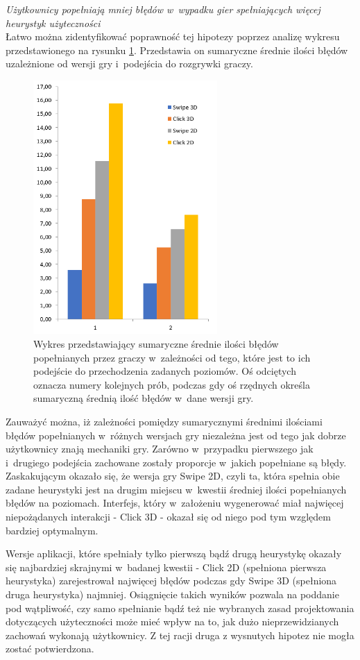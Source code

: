 \documentclass[a4paper,12pt,numbers=noenddot]{report}
\begin{document}
\textit{Użytkownicy popełniają mniej błędów w~wypadku gier spełniających więcej heurystyk użyteczności}\\

Łatwo można zidentyfikować poprawność tej hipotezy poprzez analizę wykresu przedstawionego na rysunku \ref{fig:diag_errors_sum}. Przedstawia on sumaryczne średnie ilości błędów uzależnione od wersji gry i~podejścia do rozgrywki graczy.

\begin{figure}[h!]
	\centering
  	\includegraphics[width=7cm]{diag/errors_sum.png}
	\caption{Wykres przedstawiający sumaryczne średnie ilości błędów popełnianych przez graczy w~zależności od tego, które jest to ich podejście do przechodzenia zadanych poziomów. Oś odciętych oznacza numery kolejnych prób, podczas gdy oś rzędnych określa sumaryczną średnią ilość błędów w~dane wersji gry.}
	\label{fig:diag_errors_sum}
\end{figure}

Zauważyć można, iż zależności pomiędzy sumarycznymi średnimi ilościami błędów popełnianych w~różnych wersjach gry niezależna jest od tego jak dobrze użytkownicy znają mechaniki gry. Zarówno w~przypadku pierwszego jak i~drugiego podejścia zachowane zostały proporcje w~jakich popełniane są błędy. Zaskakującym okazało się, że wersja gry Swipe 2D, czyli ta, która spełnia obie zadane heurystyki jest na drugim miejscu w~kwestii średniej ilości popełnianych błędów na poziomach. Interfejs, który w~założeniu wygenerować miał najwięcej niepożądanych interakcji - Click 3D - okazał się od niego pod tym względem bardziej optymalnym. 

Wersje aplikacji, które spełniały tylko pierwszą bądź drugą heurystykę okazały się najbardziej skrajnymi w~badanej kwestii - Click 2D (spełniona pierwsza heurystyka) zarejestrował najwięcej błędów podczas gdy Swipe 3D (spełniona druga heurystyka) najmniej. 
Osiągnięcie takich wyników pozwala na poddanie pod wątpliwość, czy samo spełnianie bądź też nie wybranych zasad projektowania dotyczących użyteczności może mieć wpływ na to, jak dużo nieprzewidzianych zachowań wykonają użytkownicy. Z tej racji druga z wysnutych hipotez nie mogła zostać potwierdzona.
\end{document}
